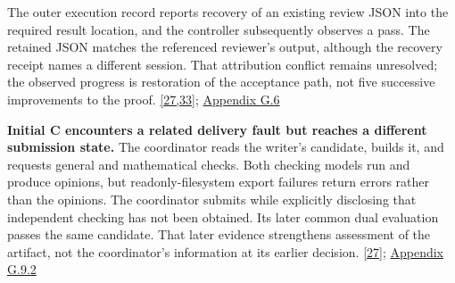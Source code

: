 The outer execution record reports recovery of an existing review JSON into the required result location, and the controller subsequently observes a pass. The retained JSON matches the referenced reviewer's output, although the recovery receipt names a different session. That attribution conflict remains unresolved; the observed progress is restoration of the acceptance path, not five successive improvements to the proof. \href{en.pdf\#ref-27}{\mbox{[27,33]}}; \href{en-appendix.pdf\#g6}{Appendix G.6}

\textbf{Initial C encounters a related delivery fault but reaches a different submission state.} The coordinator reads the writer's candidate, builds it, and requests general and mathematical checks. Both checking models run and produce opinions, but readonly-filesystem export failures return errors rather than the opinions. The coordinator submits while explicitly disclosing that independent checking has not been obtained. Its later common dual evaluation passes the same candidate. That later evidence strengthens assessment of the artifact, not the coordinator's information at its earlier decision. \href{en.pdf\#ref-27}{\mbox{[27]}}; \href{en-appendix.pdf\#g9-2}{Appendix G.9.2}

